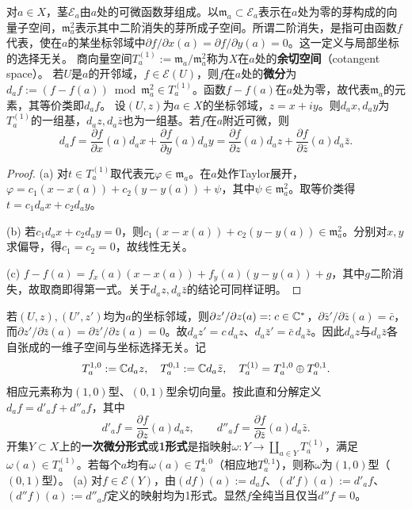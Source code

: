 对$a\in X$，茎$\mathcal E_a$由$a$处的可微函数芽组成。以$\mathfrak m_a\subset\mathcal E_a$表示在$a$处为零的芽构成的向量子空间，$\mathfrak m_a^2$表示其中二阶消失的芽所成子空间。所谓二阶消失，是指可由函数$f$代表，使在$a$的某坐标邻域中$\partial f/\partial x(a)=\partial f/\partial y(a)=0$。这一定义与局部坐标的选择无关。
商向量空间$T_a^{(1)}:=\mathfrak m_a/\mathfrak m_a^2$称为$X$在$a$处的\textbf{余切空间}（cotangent space）。
若$U$是$a$的开邻域，$f\in\mathcal E(U)$，则$f$在$a$处的\textbf{微分}为$d_af:=(f-f(a))\bmod\mathfrak m_a^2\in T_a^{(1)}$。函数$f-f(a)$在$a$处为零，故代表$\mathfrak m_a$的元素，其等价类即$d_af$。
设$(U,z)$为$a\in X$的坐标邻域，$z=x+iy$。则$d_ax,d_ay$为$T_a^{(1)}$的一组基，$d_az,d_a\bar z$也为一组基。若$f$在$a$附近可微，则
\[
d_af=\frac{\partial f}{\partial x}(a)d_ax+\frac{\partial f}{\partial y}(a)d_ay
=\frac{\partial f}{\partial z}(a)d_az+\frac{\partial f}{\partial\bar z}(a)d_a\bar z.
\]
\begin{proof}
(a) 对$t\in T_a^{(1)}$取代表元$\varphi\in\mathfrak m_a$。在$a$处作Taylor展开，$\varphi=c_1(x-x(a))+c_2(y-y(a))+\psi$，其中$\psi\in\mathfrak m_a^2$。取等价类得$t=c_1d_ax+c_2d_ay$。

(b) 若$c_1d_ax+c_2d_ay=0$，则$c_1(x-x(a))+c_2(y-y(a))\in\mathfrak m_a^2$。分别对$x,y$求偏导，得$c_1=c_2=0$，故线性无关。

(c) $f-f(a)=f_x(a)(x-x(a))+f_y(a)(y-y(a))+g$，其中$g$二阶消失，故取商即得第一式。关于$d_az,d_a\bar z$的结论可同样证明。
\end{proof}
若$(U,z),(U',z')$均为$a$的坐标邻域，则$\partial z'/\partial z(a)=:c\in\mathbb C^*$，$\partial\bar z'/\partial\bar z(a)=\bar c$，而$\partial z'/\partial\bar z(a)=\partial\bar z'/\partial z(a)=0$。故$d_az'=c\,d_az$、$d_a\bar z'=\bar c\,d_a\bar z$。因此$d_az$与$d_a\bar z$各自张成的一维子空间与坐标选择无关。记
\[
T_a^{1,0}:=\mathbb C d_az,\quad T_a^{0,1}:=\mathbb C d_a\bar z,\quad T_a^{(1)}=T_a^{1,0}\oplus T_a^{0,1}.
\]
相应元素称为$(1,0)$型、$(0,1)$型余切向量。按此直和分解定义$d_af=d'_af+d''_af$，其中
\[
d'_af=\frac{\partial f}{\partial z}(a)d_az,\qquad d''_af=\frac{\partial f}{\partial\bar z}(a)d_a\bar z.
\]
开集$Y\subset X$上的\textbf{一次微分形式}或\textbf{1形式}是指映射$\omega:Y\to\coprod_{a\in Y}T_a^{(1)}$，满足$\omega(a)\in T_a^{(1)}$。若每个$a$均有$\omega(a)\in T_a^{1,0}$（相应地$T_a^{0,1}$），则称$\omega$为$(1,0)$型（$(0,1)$型）。
(a) 对$f\in\mathcal E(Y)$，由$(df)(a):=d_af$、$(d'f)(a):=d'_af$、$(d''f)(a):=d''_af$定义的映射均为1形式。显然$f$全纯当且仅当$d''f=0$。

